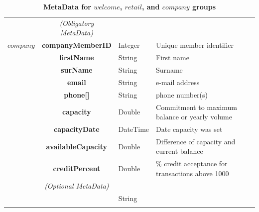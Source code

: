 \begin{table}[H]
\begin{centering}
{\begin{tabular}{ r | c | l | l }
\Xhline{1.5pt}
			& \emph{(Obligatory MetaData)} & & \\
\cline{2-2}
$company$	& {\bf companyMemberID}	&Integer & Unique member identifier \\
			& {\bf firstName}			&String & First name \\
			& {\bf surName}			&String & Surname \\
			& {\bf email}				&String & e-mail address \\
			& {\bf phone[]}				&String	& phone number(s) \\
			& {\bf capacity}				&Double & Commitment to maximum balance or yearly volume \\
			& {\bf capacityDate}			&DateTime & Date capacity was set \\
			& {\bf availableCapacity}		&Double & Difference of capacity and current balance \\
			& {\bf creditPercent}			&Double & \% credit acceptance for transactions above 1000 \\
\cline{2-2}
			 & \emph{(Optional MetaData)}& & \\
\cline{2-2}
			& {\bf } 				&String &  \\
\Xhline{1.5pt}
\end{tabular}
}
\caption{\small\textbf{MetaData  for $welcome$, $retail$, and $company$ groups}}
\label{tab:GroupMetaData}
\end{centering}
\end{table}

